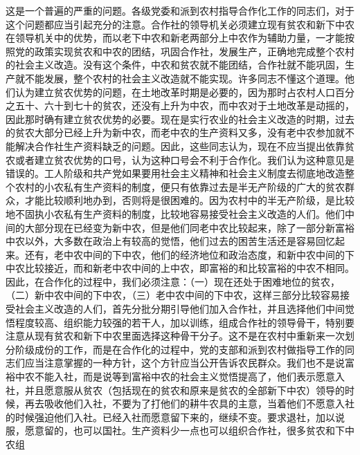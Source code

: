 这是一个普遍的严重的问题。各级党委和派到农村指导合作化工作的同志们，对于这个问题都应当引起充分的注意。合作社的领导机关必须建立现有贫农和新下中农在领导机关中的优势，而以老下中农和新老两部分上中农作为辅助力量，一才能按照党的政策实现贫农和中农的团结，巩固合作社，发展生产，正确地完成整个农村的社会主义改造。没有这个条件，中农和贫农就不能团结，合作社就不能巩固，生产就不能发展，整个农村的社会主义改造就不能实现。许多同志不懂这个道理。他们认为建立贫农优势的问题，在土地改革时期是必要的，因为那时占农村人口百分之五十、六十到七十的贫农，还没有上升为中农，而中农对于土地改革是动摇的，因此那时确有建立贫农优势的必要。现在是实行农业的社会主义改造的时期，过去的贫农大部分已经上升为新中农，而老中农的生产资料又多，没有老中农参加就不能解决合作社生产资料缺乏的问题。因此，这些同志认为，现在不应当提出依靠贫农或者建立贫农优势的口号，认为这种口号会不利于合作化。我们认为这种意见是错误的。工人阶级和共产党如果要用社会主义精神和社会主义制度去彻底地改造整个农村的小农私有生产资料的制度，便只有依靠过去是半无产阶级的广大的贫农群众，才能比较顺利地办到，否则将是很困难的。因为农村中的半无产阶级，是比较地不固执小农私有生产资料的制度，比较地容易接受社会主义改造的人们。他们中间的大部分现在已经变为新中农，但是他们同老中农比较起来，除了一部分新富裕中农以外，大多数在政治上有较高的觉悟，他们过去的困苦生活还是容易回忆起来。还有，老中农中间的下中农，他们的经济地位和政治态度，和新中农中间的下中农比较接近，而和新老中农中间的上中农，即富裕的和比较富裕的中农不相同。因此，在合作化的过程中，我们必须注意：（一）现在还处于困难地位的贫农，（二）新中农中间的下中农，（三）老中农中间的下中农，这样三部分比较容易接受社会主义改造的人们，首先分批分期引导他们加入合作社，并且选择他们中间觉悟程度较高、组织能力较强的若干人，加以训练，组成合作社的领导骨干，特别要注意从现有贫农和新下中农里面选择这种骨干分子。这不是在农村中重新来一次划分阶级成份的工作，而是在合作化的过程中，党的支部和派到农村做指导工作的同志们应当注意掌握的一种方针，这个方针应当公开告诉农民群众。我们也不是说富裕中农不能入社，而是说等到富裕中农的社会主义觉悟提高了，他们表示愿意入社，并且愿意服从贫农（包括现在的贫农和原来是贫农的全部新下中农）领导的时候，再去吸收他们入社，不要为了打他们的耕牛农具的主意，当着他们不愿意入社的时候强迫他们入社。已经入社而愿意留下来的，继续不变。要求退社，加以说服，愿意留的，也可以国社。生产资料少一点也可以组织合作社，很多贫农和下中农组